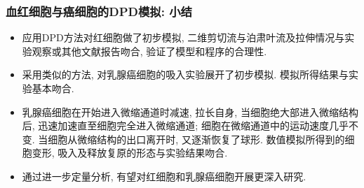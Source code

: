 
\begin{frame}
\frametitle{血红细胞与癌细胞的DPD模拟: 小结}
\note{\textcolor{red}{475-495s}}
\begin{itemize}
\item 应用DPD方法对红细胞做了初步模拟, 二维剪切流与泊肃叶流及拉伸情况与实验观察或其他文献报告吻合, 验证了模型和程序的合理性.
\item 采用类似的方法, 对乳腺癌细胞的吸入实验展开了初步模拟. 模拟所得结果与实验基本吻合.
\item 乳腺癌细胞在开始进入微缩通道时减速, 拉长自身, 当细胞绝大部进入微缩结构后, 迅速加速直至细胞完全进入微缩通道; 细胞在微缩通道中的运动速度几乎不变. 当细胞从微缩结构的出口离开时, 又逐渐恢复了球形.  数值模拟所得到的细胞变形, 吸入及释放复原的形态与实验结果吻合.
\item 通过进一步定量分析, 有望对红细胞和乳腺癌细胞开展更深入研究.
\end{itemize}
\end{frame}

